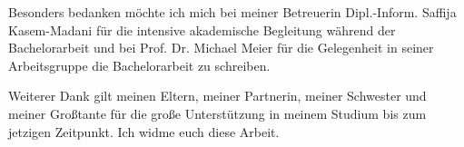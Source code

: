 Besonders bedanken möchte ich mich bei meiner Betreuerin Dipl.-Inform. Saffija Kasem-Madani für die intensive akademische Begleitung während der Bachelorarbeit und bei Prof. Dr. Michael Meier für die Gelegenheit in seiner Arbeitsgruppe die Bachelorarbeit zu schreiben.

Weiterer Dank gilt meinen Eltern, meiner Partnerin, meiner Schwester und meiner Großtante für die große Unterstützung in meinem Studium bis zum jetzigen Zeitpunkt. Ich widme euch diese Arbeit.



